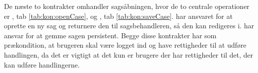\documentclass[../../main.tex]{subfiles}
\begin{document}
De næste to kontrakter omhandler sagsåbningen, hvor de to centrale operationer er , tab \ref{tab:kon:openCase}, og , tab \ref{tab:kon:saveCase}.  har ansvaret for at oprette en ny sag og returnere den til sagsbehandleren, så den kan redigeres i.  har ansvar for at gemme sagen persistent. Begge disse kontrakter har som prækondition, at brugeren skal være logget ind og have rettigheder til at udføre handlingen, da det er vigtigt at det kun er brugere der har rettigheder til det, der kan udføre handlingerne.

\begin{table}[H]
\centering
\footnotesize
{}
\caption{Kontrakt over åben sag}
\label{tab:kon:openCase}
\end{table}
\end{document}
